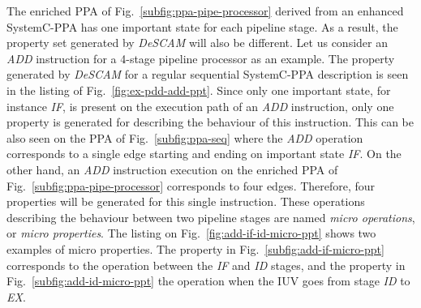 The enriched PPA of Fig.~\ref{subfig:ppa-pipe-processor} derived from an enhanced SystemC-PPA has one important state for each pipeline stage. As a result, the property set generated by \textit{DeSCAM} will also be different. Let us consider an \textit{ADD} instruction for a 4-stage pipeline processor as an example. The property generated by \textit{DeSCAM} for a regular sequential SystemC-PPA description is seen in the listing of Fig.~\ref{fig:ex-pdd-add-ppt}. Since only one important state, for instance \textit{IF}, is present on the execution path of an \textit{ADD} instruction, only one property is generated for describing the behaviour of this instruction. This can be also seen on the PPA of Fig.~\ref{subfig:ppa-seq} where the \textit{ADD} operation corresponds to a single edge starting  and ending on important state \textit{IF}. On the other hand, an \textit{ADD} instruction execution on the enriched PPA of Fig.~\ref{subfig:ppa-pipe-processor} corresponds to four edges. Therefore, four properties will be generated for this single instruction. These operations describing the behaviour between two pipeline stages are named \textit{micro operations}, or \textit{micro properties}. The listing on Fig.~\ref{fig:add-if-id-micro-ppt} shows two examples of micro properties. The property in Fig.~\ref{subfig:add-if-micro-ppt} corresponds to the operation between the \textit{IF} and \textit{ID} stages, and the property in Fig.~\ref{subfig:add-id-micro-ppt} the operation when the IUV goes from stage \textit{ID} to \textit{EX}.


